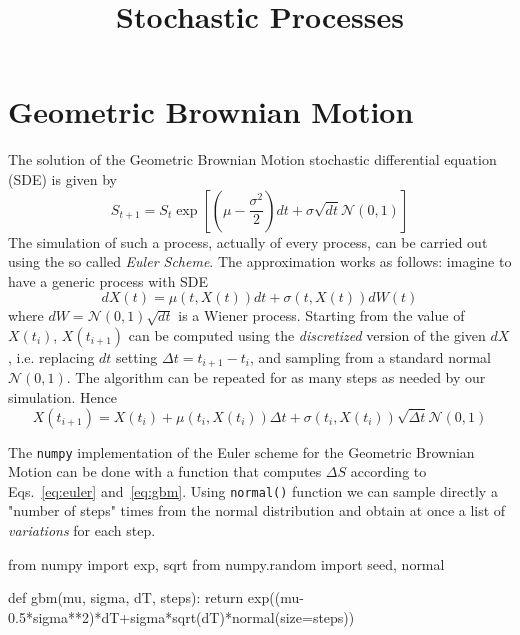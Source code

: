\documentclass[]{article}
\title{Stochastic Processes}
\author{}
\begin{document}
	
	\maketitle
	
	\section{Geometric Brownian Motion}
	
	The solution of the Geometric Brownian Motion stochastic differential equation (SDE) is given by
	\begin{equation}
S_{t+1} = S_{t}\exp\left[\left(\mu-\frac{\sigma^2}{2}\right)dt+\sigma\sqrt{dt}\mathcal{N}(0,1)\right]
\label{eq:gbm}
	\end{equation}
	The simulation of such a process, actually of every process, can be carried out using the so called \emph{Euler Scheme}.
	The approximation works as follows: imagine to have a generic process with SDE
	\begin{equation}
dX(t) = \mu(t,X(t))dt + \sigma(t,X(t))dW(t)
	\end{equation}
	where $dW=\mathcal{N}(0,1)\sqrt{dt}$ is a Wiener process. Starting from the value of $X(t_i)$, $X(t_{i+1})$ can be computed using the \emph{discretized} version of the given $dX$, i.e. replacing $dt$ setting $\Delta t = t_{i+1} - t_{i}$, and sampling from a standard normal $\mathcal{N}(0,1)$. The algorithm can be repeated for as many steps as needed by our simulation. Hence 
	\begin{equation}
		X(t_{i+1}) = X(t_i) + \mu(t_i,X(t_i))\Delta t + \sigma(t_i,X(t_i))\sqrt{\Delta t}\mathcal{N}(0,1)
		\label{eq:euler}
	\end{equation}
	
	The \texttt{numpy} implementation of the Euler scheme for the Geometric Brownian Motion can be done with a function that computes $\Delta S$ according to Eqs.~\ref{eq:euler} and~\ref{eq:gbm}. Using \texttt{normal()} function we can sample directly a "number of steps" times from the normal distribution and obtain at once a list of \emph{variations} for each step.  
\begin{ipython}
from numpy import exp, sqrt
from numpy.random import seed, normal

def gbm(mu, sigma, dT, steps):
    return exp((mu-0.5*sigma**2)*dT+sigma*sqrt(dT)*normal(size=steps))
\end{ipython}
	
\end{document}
